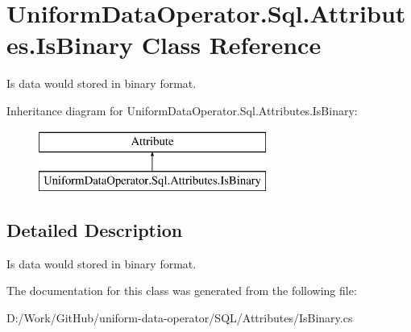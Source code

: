 \hypertarget{class_uniform_data_operator_1_1_sql_1_1_attributes_1_1_is_binary}{}\section{Uniform\+Data\+Operator.\+Sql.\+Attributes.\+Is\+Binary Class Reference}
\label{class_uniform_data_operator_1_1_sql_1_1_attributes_1_1_is_binary}


Is data would stored in binary format.  


Inheritance diagram for Uniform\+Data\+Operator.\+Sql.\+Attributes.\+Is\+Binary\+:\begin{figure}[H]
\begin{center}
\leavevmode
\includegraphics[height=2.000000cm]{d7/d13/class_uniform_data_operator_1_1_sql_1_1_attributes_1_1_is_binary}
\end{center}
\end{figure}


\subsection{Detailed Description}
Is data would stored in binary format. 



The documentation for this class was generated from the following file\+:\begin{DoxyCompactItemize}
\item 
D\+:/\+Work/\+Git\+Hub/uniform-\/data-\/operator/\+S\+Q\+L/\+Attributes/Is\+Binary.\+cs\end{DoxyCompactItemize}
